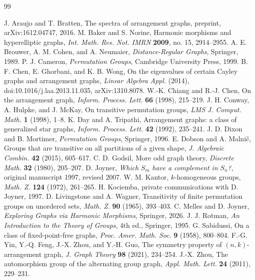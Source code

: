 \documentclass[12pt,letterpaper]{article}
\numberwithin{equation}{section}
\theoremstyle{definition}
\begin{document}
\begin{thebibliography}{99}
 J. Araujo and T. Bratten, The spectra of arrangement graphs, preprint, arXiv:1612.04747, 2016.
 M. Baker and S. Norine, Harmonic morphisms and hyperelliptic graphs, \emph{Int. Math. Res. Not. IMRN} \textbf{2009}, no. 15, 2914--2955.
 A. E. Brouwer, A. M. Cohen, and A. Neumaier, \emph{Distance-Regular Graphs}, Springer, 1989.
 P. J. Cameron, \emph{Permutation Groups}, Cambridge University Press, 1999.
 B. F. Chen, E. Ghorbani, and K. B. Wong, On the eigenvalues of certain Cayley graphs and arrangement graphs, \emph{Linear Algebra Appl.} (2014), doi:10.1016/j.laa.2013.11.035, arXiv:1310.8078.
 W.-K. Chiang and R.-J. Chen, On the arrangement graph, \emph{Inform. Process. Lett.} \textbf{66} (1998), 215--219.
 J. H. Conway, A. Hulpke, and J. McKay, On transitive permutation groups, \emph{LMS J. Comput. Math.} \textbf{1} (1998), 1--8.
 K. Day and A. Tripathi, Arrangement graphs: a class of generalized star graphs, \emph{Inform. Process. Lett.} \textbf{42} (1992), 235--241.
 J. D. Dixon and B. Mortimer, \emph{Permutation Groups}, Springer, 1996.
 E. Dobson and A. Malni\v{c}, Groups that are transitive on all partitions of a given shape, \emph{J. Algebraic Combin.} \textbf{42} (2015), 605--617.
 C. D. Godsil, More odd graph theory, \emph{Discrete Math.} \textbf{32} (1980), 205--207.
 D. Joyner, \emph{Which $S_m$ have a complement in $S_n$?}, original manuscript 1997, revised 2007.
 W. M. Kantor, $k$-homogeneous groups, \emph{Math. Z.} \textbf{124} (1972), 261--265.
 H. Kociemba, private communications with D. Joyner, 1997.
 D. Livingstone and A. Wagner, Transitivity of finite permutation groups on unordered sets, \emph{Math. Z.} \textbf{90} (1965), 393--403.
 C. Melles and D. Joyner, \emph{Exploring Graphs via Harmonic Morphisms}, Springer, 2026.
 J. J. Rotman, \emph{An Introduction to the Theory of Groups}, 4th ed., Springer, 1995.
 G. Sabidussi, On a class of fixed-point-free graphs, \emph{Proc. Amer. Math. Soc.} \textbf{9} (1958), 800--804.
 F.-G. Yin, Y.-Q. Feng, J.-X. Zhou, and Y.-H. Guo, The symmetry property of $(n,k)$-arrangement graph, \emph{J. Graph Theory} \textbf{98} (2021), 234--254.
 J.-X. Zhou, The automorphism group of the alternating group graph, \emph{Appl. Math. Lett.} \textbf{24} (2011), 229--231.
\end{thebibliography}
\end{document}
